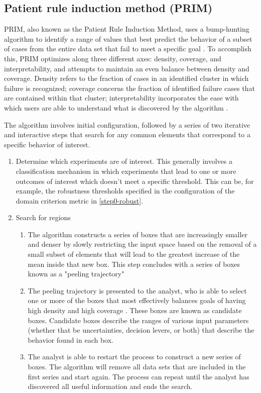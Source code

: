 \subsection{Patient rule induction method (PRIM)}
PRIM, also known as the Patient Rule Induction Method, uses a bump-hunting algorithm to identify a range of values that best predict the behavior of a subset of cases from the entire data set that fail to meet a specific goal \citep{Friedman1999}. To accomplish this, PRIM optimizes along three different axes: density, coverage, and interpretability, and attempts to maintain an even balance between density and coverage. Density refers to the fraction of cases in an identified cluster in which failure is recognized; coverage concerns the fraction of identified failure cases that are contained within that cluster; interpretability incorporates the ease with which users are able to understand what is discovered by the algorithm \citep{Lempert2013}. 

The algorithm involves initial configuration, followed by a series of two iterative and interactive steps that search for any common elements that correspond to a specific behavior of interest. 

\begin{enumerate}[leftmargin=*]
    \item Determine which experiments are of interest. This generally involves a classification mechanism in which experiments that lead to one or more outcomes of interest which doesn't meet a specific threshold. This can be, for example, the robustness thresholds specified in the configuration of the domain criterion metric in \cref{step0-robust}. 
    \item Search for regions
    \begin{enumerate}
        \item The algorithm constructs a series of boxes that are increasingly smaller and denser by slowly restricting the input space based on the removal of a small subset of elements that will lead to the greatest increase of the mean inside that new box. This step concludes with a series of boxes known as a "peeling trajectory" \citep{Lempert2008}
        \item The peeling trajectory is presented to the analyst, who is able to select one or more of the boxes that most effectively balances goals of having high density and high coverage \citep{Lempert2008}. These boxes are known as candidate boxes. Candidate boxes describe the ranges of various input parameters (whether that be uncertainties, decision levers, or both) that describe the behavior found in each box. 
        \item The analyst is able to restart the process to construct a new series of boxes. The algorithm will remove all data sets that are included in the first series and start again. The process can repeat until the analyst has discovered all useful information and ends the search. 
    \end{enumerate}
\end{enumerate}

